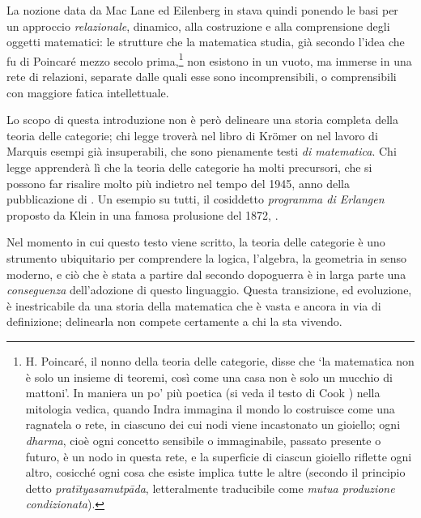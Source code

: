 La nozione data da Mac Lane ed Eilenberg in \cite{gtone} stava quindi ponendo le basi per un approccio \emph{relazionale}, dinamico, alla costruzione e alla comprensione degli oggetti matematici: le strutture che la matematica studia, già secondo l'idea che fu di Poincaré mezzo secolo prima,\footnote{H. Poincaré, il nonno della teoria delle categorie, disse che `la matematica non è solo un insieme di teoremi, così come una casa non è solo un mucchio di mattoni'. In maniera un po' più poetica (si veda il testo di Cook \cite{Cook1977-ry}) nella mitologia vedica, quando Indra immagina il mondo lo costruisce come una ragnatela o rete, in ciascuno dei cui nodi viene incastonato un gioiello; ogni \emph{dharma}, cioè ogni concetto sensibile o immaginabile, passato presente o futuro, è un nodo in questa rete, e la superficie di ciascun gioiello riflette ogni altro, cosicché ogni cosa che esiste implica tutte le altre (secondo il principio detto \emph{pratītyasamutpāda}, letteralmente traducibile come \emph{mutua produzione condizionata}).} non esistono in un vuoto, ma immerse in una rete di relazioni, separate dalle quali esse sono incomprensibili, o comprensibili con maggiore fatica intellettuale.

\medskip
Lo scopo di questa introduzione non è però delineare una storia completa della teoria delle categorie; chi legge troverà nel libro di Kr\"omer \cite{kromer} on nel lavoro di Marquis \cite{marquis} esempi già insuperabili, che sono pienamente testi \emph{di matematica}. Chi legge apprenderà lì che la teoria delle categorie ha molti precursori, che si possono far risalire molto più indietro nel tempo del 1945, anno della pubblicazione di \cite{gtone}. Un esempio su tutti, il cosiddetto \emph{programma di Erlangen} proposto da Klein in una famosa prolusione del 1872, \cite{Klein1893}.

Nel momento in cui questo testo viene scritto, la teoria delle categorie è uno strumento ubiquitario per comprendere la logica, l'algebra, la geometria in senso moderno, e ciò che è stata a partire dal secondo dopoguerra è in larga parte una \emph{conseguenza} dell'adozione di questo linguaggio. Questa transizione, ed evoluzione, è inestricabile da una storia della matematica che è vasta e ancora in via di definizione; delinearla non compete certamente a chi la sta vivendo.

